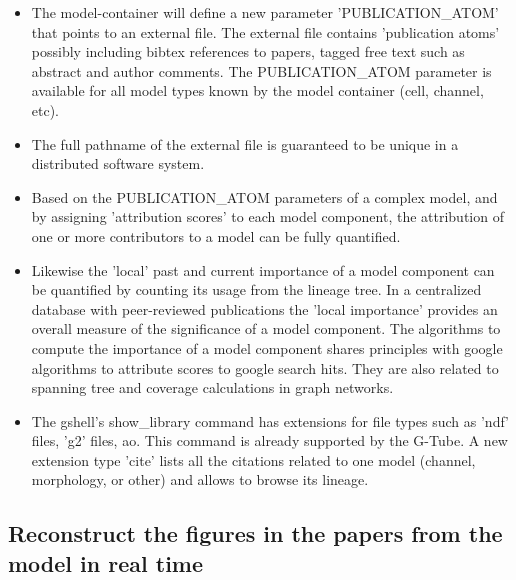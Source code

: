 \documentclass[12pt]{article}
\begin{document}
\begin{itemize}
\item The model-container will define a new parameter
  'PUBLICATION\_ATOM' that points to an external file.  The external
  file contains 'publication atoms' possibly including bibtex
  references to papers, tagged free text such as abstract and author
  comments.  The PUBLICATION\_ATOM parameter is available for all
  model types known by the model container (cell, channel, etc).
\item The full pathname of the external file is guaranteed to be
  unique in a distributed software system.
\item Based on the PUBLICATION\_ATOM parameters of a complex model,
  and by assigning 'attribution scores' to each model component, the
  attribution of one or more contributors to a model can be fully
  quantified.
\item Likewise the 'local' past and current importance of a model
  component can be quantified by counting its usage from the lineage
  tree.  In a centralized database with peer-reviewed publications the
  'local importance' provides an overall measure of the significance
  of a model component.  The algorithms to compute the importance of a
  model component shares principles with google algorithms to
  attribute scores to google search hits.  They are also related to
  spanning tree and coverage calculations in graph networks.
\item The gshell's show\_library command has extensions for file types
  such as 'ndf' files, 'g2' files, ao.  This command is already
  supported by the G-Tube.  A new extension type 'cite' lists all the
  citations related to one model (channel, morphology, or other) and
  allows to browse its lineage.
\end{itemize}


\subsection{Reconstruct the figures in the papers from the model in real time}
\end{document}
